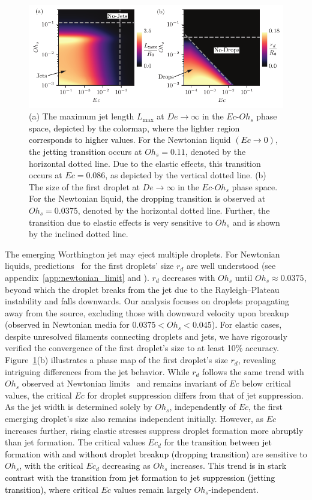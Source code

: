 \documentclass{jfm}
\newcommand{\DL}[1]{{\textcolor{black}{#1}}}
\newcommand{\VS}[1]{{\textcolor{black}{#1}}}
\newcommand{\AO}[1]{{\textcolor{black}{#1}}}
\newcommand{\KZ}[1]{{\textcolor{black}{#1}}}
\newcommand{\AKD}[1]{{\textcolor{black}{#1}}}
\newcommand{\oo}{\color{black} \normalfont}
\newcommand{\bb}{\color{black} \normalfont}
\begin{document}
\begin{figure}
	\includegraphics[width=\textwidth]{High_De_05-eps-converted-to.pdf}
	\caption{(a) The maximum jet length $L_{\text{max}}$ at $De \to \infty$ in the $Ec$-$Oh_s$ phase space\AKD{, depicted by the colormap, where the lighter region corresponds to higher values}. For the Newtonian liquid \DL{$\left(Ec \to 0\right)$}, the \VS{jetting transition} occurs at $Oh_s = 0.11$, denoted by the horizontal dotted line. Due to the elastic effect\AO{s}, this transition occurs at $Ec = 0.086$, as depicted by the vertical dotted line. (b) The size of the first droplet at $De \to \infty$ in the $Ec$-$Oh_s$ phase space. For the Newtonian liquid, \VS{the dropping transition} is observed at $Oh_s = 0.0375$, denoted by the horizontal dotted line. Further, the transition due to elastic effects is very sensitive to $Oh_s$ and is shown by the inclined dotted line.}
	\label{highDe}
\end{figure}

The emerging Worthington jet may eject multiple droplets. For Newtonian liquids, \oo predictions\bb\, for the first droplets' size $r_d$ are well understood (see appendix~\ref{app:newtonian_limit} and \cite{ganan2017revision,blanco2020sea}). $r_d$ decreases with $Oh_s$ until $Oh_s \approx 0.0375$, beyond which \DL{the} droplet breaks \DL{from the jet} due to the Rayleigh--Plateau instability and \AKD{falls} downwards. Our analysis focuses on droplets propagating away from the source, excluding those with downward velocity upon breakup (observed in Newtonian media for $0.0375 < Oh_s < 0.045$). For elastic cases, despite unresolved filaments connecting droplets and jets, we have rigorously verified the convergence of the first droplet's size to at least 10\% accuracy.
Figure~\ref{highDe}(b) illustrates a phase map of the first droplet's size $r_d$, revealing intriguing differences from the jet behavior. While $r_d$ follows the same trend with $Oh_s$ \oo observed at Newtonian limits\bb\, and remains invariant of $Ec$ below critical values, the critical $Ec$ for droplet suppression differs from that of jet suppression. As the jet width is determined solely by $Oh_s$, \KZ{independently} of $Ec$, the first emerging droplet's size also remains independent initially. However, as $Ec$ increases further, rising elastic stresses suppress droplet formation more \AO{abruptly} than jet formation.
The critical values $Ec_d$ for \VS{the transition between jet formation with and without droplet breakup (dropping transition)} are sensitive to $Oh_s$, with the critical $Ec_d$ decreasing as $Oh_s$ increases. This trend \AO{is in stark contrast} with \VS{the transition from jet formation to jet suppression (jetting transition)}, where critical $Ec$ values remain largely $Oh_s$-independent.
\end{document}
